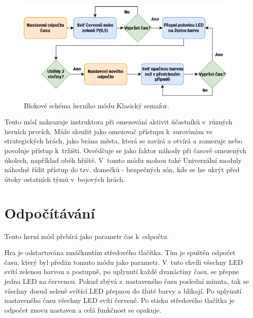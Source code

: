 \begin{figure}[!h]
  \begin{center}
    \includegraphics[scale=0.7]{obrazky/Klasicky_semafor_diagram.png}
  \end{center}
  \caption[Blokové schéma herního módu Klasický semafor]{Blokové schéma herního módu Klasický semafor.}
\end{figure}

Tento mód nahrazuje instruktora při omezování aktivit účastníků v~různých herních prvcích. Může sloužit jako omezovač přístupu k~surovinám ve strategických hrách, jako brána města, která se zavírá 
a otvírá a zamezuje nebo povoluje přístup k~tržišti. Osvědčuje se jako faktor náhody při časově omezených úkolech, například oběh hřiště. V~tomto módu mohou také Univerzální moduly náhodně řídit 
přístup do tzv. domečků - bezpečných zón, kde se lze ukrýt před útoky ostatních týmů v~bojových hrách.

\section{Odpočítávání}
Tento herní mód přebírá jako parametr čas k~odpočtu.

Hra je odstartována zmáčknutím středového tlačítka. Tím je spuštěn odpočet času, který byl předán tomuto módu jako parametr. V~tuto chvíli všechny LED svítí zelenou barvou a postupně, po uplynutí každé 
dvanáctiny času, se přepne jedna LED na červenou. Pokud zbývá z~nastaveného času poslední minuta, tak se všechny dosud zeleně svítící LED přepnou do žluté barvy a blikají. Po uplynutí nastaveného času 
všechny LED svítí červeně. Po stisku středového tlačítka je odpočet znovu nastaven a celá funkčnost se opakuje.  

